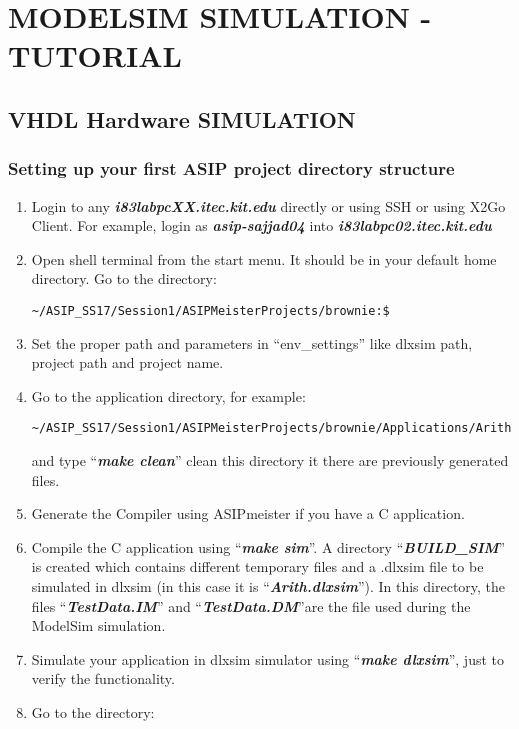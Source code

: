 \chapter*{MODELSIM SIMULATION -TUTORIAL}
\section*{VHDL Hardware SIMULATION}
\subsection{Setting up your first ASIP project directory structure}
\begin{enumerate}
\item Login to any \emph{\textbf{i83labpcXX.itec.kit.edu}} directly or using SSH or using X2Go Client. For example, login as
	\emph{\textbf{asip-sajjad04}} into \emph{\textbf{i83labpc02.itec.kit.edu}}
\item Open shell terminal from the start menu. It should be in your default home directory. Go to the directory:
\begin{lstlisting} 
~/ASIP_SS17/Session1/ASIPMeisterProjects/brownie:$ 
\end{lstlisting}
\item Set the proper path and parameters in ``env\_settings'' like dlxsim path, project path and project name.
\item Go to the application directory, for example:
\begin{lstlisting} 
~/ASIP_SS17/Session1/ASIPMeisterProjects/brownie/Applications/Arith:$
\end{lstlisting}
	and type ``\emph{\textbf{make clean}}'' clean this directory it there are previously generated files.
\item Generate the Compiler using ASIPmeister if you have a C application.
\item Compile the C application using ``\emph{\textbf{make sim}}''. A directory ``\emph{\textbf{BUILD\_SIM}}'' is created which contains different temporary files and a .dlxsim file to be simulated in dlxsim (in this case it is ``\emph{\textbf{Arith.dlxsim}}''). In this directory, the files ``\emph{\textbf{TestData.IM}}'' and
	``\emph{\textbf{TestData.DM}}''are the file used during the ModelSim simulation.
\item Simulate your application in dlxsim simulator using ``\emph{\textbf{make dlxsim}}'', just to verify the functionality.
\item Go to the directory:
\begin{lstlisting} 

\end{lstlisting}
\end{enumerate}
